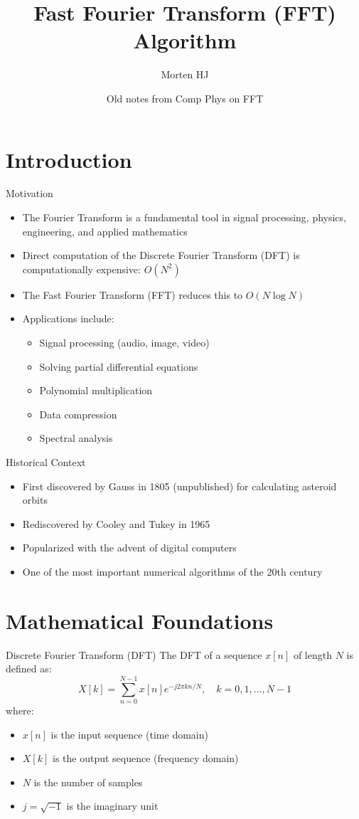 \documentclass{beamer}
\title{Fast Fourier Transform (FFT) Algorithm}
\author{Morten HJ}
\date{Old notes from Comp Phys on FFT}
\begin{document}
\frame{\titlepage}

\section{Introduction}

\begin{frame}{Motivation}
  \begin{itemize}
  \item The Fourier Transform is a fundamental tool in signal processing, physics, engineering, and applied mathematics
  \item Direct computation of the Discrete Fourier Transform (DFT) is computationally expensive: $O(N^2)$
  \item The Fast Fourier Transform (FFT) reduces this to $O(N \log N)$
  \item Applications include:
    \begin{itemize}
    \item Signal processing (audio, image, video)
    \item Solving partial differential equations
    \item Polynomial multiplication
    \item Data compression
    \item Spectral analysis
    \end{itemize}
  \end{itemize}
\end{frame}

\begin{frame}{Historical Context}
  \begin{itemize}
  \item First discovered by Gauss in 1805 (unpublished) for calculating asteroid orbits
  \item Rediscovered by Cooley and Tukey in 1965
  \item Popularized with the advent of digital computers
  \item One of the most important numerical algorithms of the 20th century
  \end{itemize}
\end{frame}

\section{Mathematical Foundations}

\begin{frame}{Discrete Fourier Transform (DFT)}
  The DFT of a sequence $x[n]$ of length $N$ is defined as:
  \[ X[k] = \sum_{n=0}^{N-1} x[n] e^{-j 2\pi k n / N}, \quad k = 0,1,\ldots,N-1 \]
  where:
  \begin{itemize}
  \item $x[n]$ is the input sequence (time domain)
  \item $X[k]$ is the output sequence (frequency domain)
  \item $N$ is the number of samples
  \item $j = \sqrt{-1}$ is the imaginary unit
  \end{itemize}
\end{frame}
\end{document}
